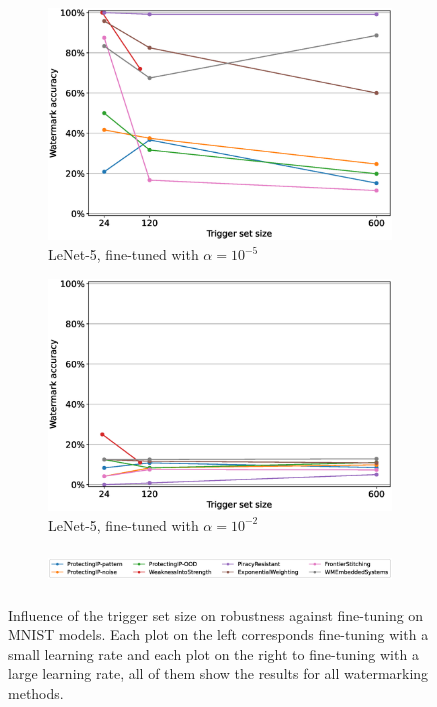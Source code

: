 \begin{figure}
\begin{subfigure}{0.41\linewidth}
        \includegraphics[width=\linewidth]{images/finetuning/lenet5_finetuning_per_arch_1e-05.eps}
        \caption{LeNet-5, fine-tuned with $\alpha=10^{-5}$}
        \label{fig:finetuning-smalllr-allmethods-perarch-lenet5}
    \end{subfigure}
    \quad
    \begin{subfigure}{0.41\linewidth}
        \includegraphics[width=\linewidth]{images/finetuning/lenet5_finetuning_per_arch_001.eps}
        \caption{LeNet-5, fine-tuned with $\alpha=10^{-2}$}
        \label{fig:finetuning-largelr-allmethods-perarch-lenet5}
    \end{subfigure}
    
    \begin{subfigure}{\linewidth}
    \centering
    \includegraphics[height=1cm]{images/finetuning/legend_finetuning_per_arch_colors.eps}
    \end{subfigure}
    
    \caption{Influence of the trigger set size on robustness against fine-tuning on MNIST models. Each plot on the left corresponds fine-tuning with a small learning rate and each plot on the right to fine-tuning with a large learning rate, all of them show the results for all watermarking methods.}
    \label{fig:finetuning-mnistmodels-perarch}
\end{figure}
